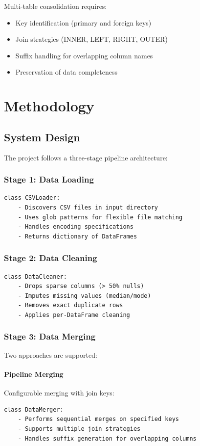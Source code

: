 \documentclass[12pt,a4paper]{report}
\begin{document}
Multi-table consolidation requires:
\begin{itemize}
    \item Key identification (primary and foreign keys)
    \item Join strategies (INNER, LEFT, RIGHT, OUTER)
    \item Suffix handling for overlapping column names
    \item Preservation of data completeness
\end{itemize}

\chapter{Methodology}

\section{System Design}

The project follows a three-stage pipeline architecture:

\subsection{Stage 1: Data Loading}

\begin{lstlisting}
class CSVLoader:
    - Discovers CSV files in input directory
    - Uses glob patterns for flexible file matching
    - Handles encoding specifications
    - Returns dictionary of DataFrames
\end{lstlisting}

\subsection{Stage 2: Data Cleaning}

\begin{lstlisting}
class DataCleaner:
    - Drops sparse columns (> 50% nulls)
    - Imputes missing values (median/mode)
    - Removes exact duplicate rows
    - Applies per-DataFrame cleaning
\end{lstlisting}

\subsection{Stage 3: Data Merging}

Two approaches are supported:

\subsubsection{Pipeline Merging}
Configurable merging with join keys:
\begin{lstlisting}
class DataMerger:
    - Performs sequential merges on specified keys
    - Supports multiple join strategies
    - Handles suffix generation for overlapping columns
\end{lstlisting}
\end{document}
